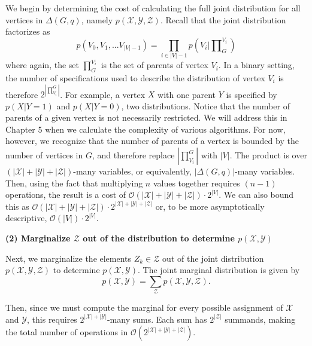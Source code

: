 \begin{myindentpar}{1.5em}
\null \quad \quad We begin by determining the cost of calculating the full joint distribution for all vertices in $\Delta(G,q)$, namely $p(\mathcal{X},\mathcal{Y},\mathcal{Z})$. Recall that the joint distribution factorizes as 
$$p(V_{0},V_{1},...V_{|V|-1}) = \prod_{i \in |V|-1} p(V_{i}|\prod\nolimits_{G}^{V_{i}})$$
 where again, the set $\prod\nolimits_{G}^{V_{i}}$ is the set of parents of vertex $V_{i}$. In a binary setting, the number of specifications used to describe the distribution of vertex $V_{i}$ is therefore $2^{|\prod\nolimits_{V_{i}}^{G}|}$. For example, a vertex $X$ with one parent $Y$ is specified by $p(X|Y=1)$ and $p(X|Y=0)$, two distributions.\newline
 \null \quad \quad Notice that the number of parents of a given vertex is not necessarily restricted. We will address this in Chapter 5 when we calculate the complexity of various algorithms. For now, however, we recognize that the number of parents of a vertex is bounded by the number of vertices in $G$, and therefore replace $|\prod\nolimits_{V_{i}}^{G}|$ with $|V|$. \newline
\null \quad \quad The product is over $(|\mathcal{X}| + |\mathcal{Y}| + |\mathcal{Z}|)$-many variables, or equivalently, $|\Delta(G,q)|$-many variables. Then, using the fact that multiplying $n$ values together requires $(n-1)$ operations, the result is a cost of $\mathcal{O}(|\mathcal{X}|+|\mathcal{Y}|+|\mathcal{Z}|)\cdot 2^{|V|}$. We can also bound this as $\mathcal{O}(|\mathcal{X}|+|\mathcal{Y}|+|\mathcal{Z}|)\cdot 2^{|\mathcal{X}|+|\mathcal{Y}|+|\mathcal{Z}|}$ or, to be more asymptotically descriptive, $\mathcal{O}(|V|)\cdot 2^{|V|}$.
\end{myindentpar} 

\textbf{(2) Marginalize $\mathcal{Z}$ out of the distribution to determine $p(\mathcal{X}, \mathcal{Y})$}
\vspace{-4mm}

\begin{myindentpar}{1.5em}
\null \quad \quad Next, we marginalize the elements $Z_{k} \in \mathcal{Z}$ out of the joint distribution $p(\mathcal{X},\mathcal{Y},\mathcal{Z})$ to determine $p(\mathcal{X},\mathcal{Y})$. The joint marginal distribution is given by 
$$p(\mathcal{X},\mathcal{Y}) = \sum_{\mathcal{Z}} p(\mathcal{X},\mathcal{Y}, \mathcal{Z}).$$

Then, since we must compute the marginal for every possible assignment of $\mathcal{X}$ and $\mathcal{Y}$, this requires $2^{|\mathcal{X}|+|\mathcal{Y}|}$-many sums. Each sum has $2^{|\mathcal{Z}|}$ summands, making the total number of operations in $\mathcal{O}(2^{|\mathcal{X}| + |\mathcal{Y}| + |\mathcal{Z}|})$.
\end{myindentpar}

